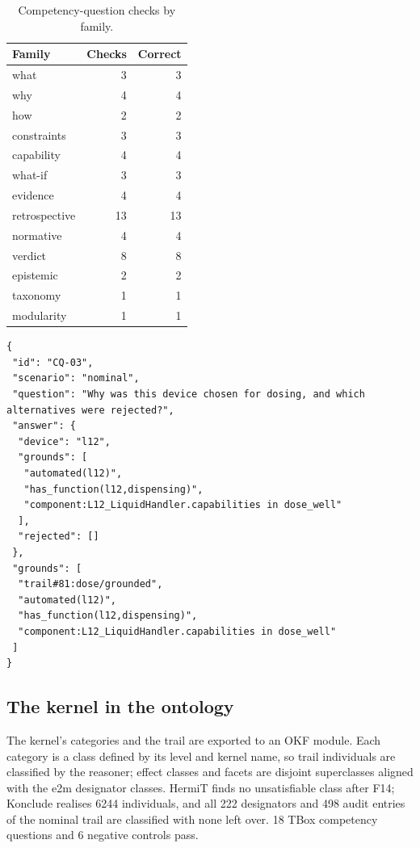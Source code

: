 \documentclass[10pt,a4paper]{article}
\begin{document}
\begin{table}[tbp]\centering\small
\caption{Competency-question checks by family.}\label{tab:cqfam}
\begin{tabularx}{\linewidth}{Xrr}\toprule
\textbf{Family} & \textbf{Checks} & \textbf{Correct} \\\midrule
what & 3 & 3 \\
why & 4 & 4 \\
how & 2 & 2 \\
constraints & 3 & 3 \\
capability & 4 & 4 \\
what-if & 3 & 3 \\
evidence & 4 & 4 \\
retrospective & 13 & 13 \\
normative & 4 & 4 \\
verdict & 8 & 8 \\
epistemic & 2 & 2 \\
taxonomy & 1 & 1 \\
modularity & 1 & 1 \\\bottomrule
\end{tabularx}
\end{table}

\begin{listing}[tbp]
\begin{Verbatim}[fontsize=\footnotesize,breaklines,frame=lines,framesep=2mm]
{
 "id": "CQ-03",
 "scenario": "nominal",
 "question": "Why was this device chosen for dosing, and which alternatives were rejected?",
 "answer": {
  "device": "l12",
  "grounds": [
   "automated(l12)",
   "has_function(l12,dispensing)",
   "component:L12_LiquidHandler.capabilities in dose_well"
  ],
  "rejected": []
 },
 "grounds": [
  "trail#81:dose/grounded",
  "automated(l12)",
  "has_function(l12,dispensing)",
  "component:L12_LiquidHandler.capabilities in dose_well"
 ]
}
\end{Verbatim}
\caption{An answer with grounds: why L12 was chosen for dosing and which devices were rejected (CQ-03, nominal).}\label{lst:cq}
\end{listing}

\subsection{The kernel in the ontology}\label{sec:okf}

The kernel's categories and the trail are exported to an OKF module. Each category is a class defined by its level and kernel name, so trail individuals are classified by the reasoner; effect classes and facets are disjoint superclasses aligned with the e2m designator classes. HermiT finds no unsatisfiable class after F14; Konclude realises 6244 individuals, and all 222 designators and 498 audit entries of the nominal trail are classified with none left over. 18 TBox competency questions and 6 negative controls pass.
\end{document}
